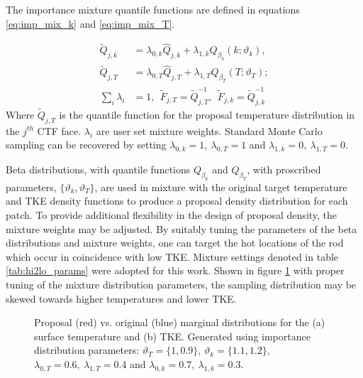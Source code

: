 The importance  mixture quantile functions are defined in equations \ref{eq:imp_mix_k} and \ref{eq:imp_mix_T}.

\begin{align}
\tilde Q_{j,k} &= \lambda_{0,k} \hat Q_{j,k}  + \lambda_{1,k} Q_{\beta_k}(k; \vartheta_k),  \label{eq:imp_mix_k} \\
\tilde Q_{j,T} &= \lambda_{0,T} \hat Q_{j,T}  + \lambda_{1,T} Q_{\beta_T}(T; \vartheta_T);  \label{eq:imp_mix_T} \\
\sum_i \lambda_i &= 1, \ \ \tilde F_{j,T} = \tilde Q^{-1}_{j,T},\ \  \tilde F_{j,k} = \tilde Q^{-1}_{j,k}
\label{eq:imp_mix_dists}
\end{align}
Where $\tilde Q_{j,T}$ is the quantile function for the proposal temperature distribution in the $j^{th}$ CTF face. $\lambda_i$ are user set mixture weights. Standard Monte Carlo sampling can be recovered by setting $\lambda_{0,k}=1,\ \lambda_{0,T}=1$ and  $\lambda_{1,k}=0,\ \lambda_{1,T}=0$.

Beta distributions, with quantile functions $Q_{\beta_k}$ and $Q_{\beta_T}$,  with proscribed parameters, $\{ \vartheta_k, \vartheta_T \}$, are used in mixture with the original target temperature and TKE density functions to produce a proposal density distribution for each patch.  To provide additional flexibility in the design of proposal density, the mixture weights may be adjusted. By suitably tuning the parameters of the beta distributions and mixture weights, one can target the hot locations of the rod which occur in coincidence with low TKE.  Mixture settings denoted in table \ref{tab:hi2lo_params} were adopted for this work.  Shown in figure \ref{fig:imp_sample2} with proper tuning of the mixture distribution parameters, the sampling distribution may be skewed towards higher temperatures and lower TKE.

\begin{figure}[H]%
    \centering
    \hspace*{-1.0em}%
    \caption[Proposal and target density functions used for importance sampling.]{Proposal (red) vs. original (blue) marginal distributions for the (a) surface temperature and (b) TKE.  Generated using importance distribution parameters: $\vartheta_T = \{1, 0.9\}$,  $\vartheta_k = \{1.1, 1.2\}$,  $\lambda_{0,T}=0.6,\ \lambda_{1,T}=0.4$ and $\lambda_{0,k}=0.7,\ \lambda_{1,k}=0.3$.}%
    \label{fig:imp_sample2}%
\end{figure}


